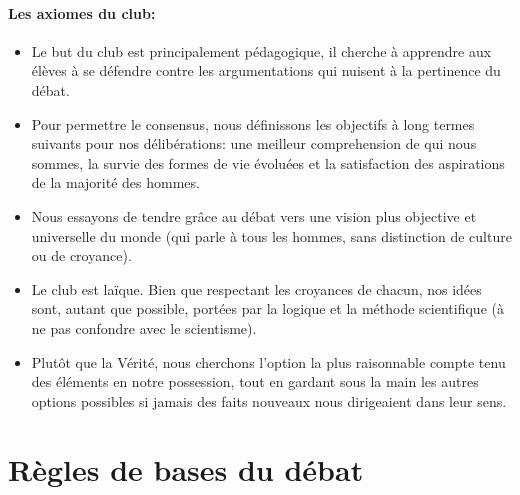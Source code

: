 \documentclass[a4paper,12pt]{article}
\begin{document}
\paragraph{Les axiomes du club:}
\begin{itemize}
 \item  Le but du club est principalement pédagogique, il cherche à apprendre aux élèves à se défendre contre les argumentations qui nuisent à la pertinence du débat.
 \item  Pour permettre le consensus, nous définissons les objectifs à long termes suivants pour nos délibérations: une meilleur comprehension de qui nous sommes, la survie des formes de vie évoluées et la satisfaction des aspirations de la majorité des hommes.
 \item  Nous essayons de tendre grâce au débat vers une vision plus objective et universelle du monde (qui parle à tous les hommes, sans distinction de culture ou de croyance).
 \item  Le club est laïque. Bien que respectant les croyances de chacun, nos idées sont, autant que possible, portées par la logique et la méthode scientifique (à ne pas confondre avec le scientisme).
 \item  Plutôt que la Vérité, nous cherchons l'option la plus raisonnable compte tenu des éléments en notre possession, tout en gardant sous la main les autres options possibles si jamais des faits nouveaux nous dirigeaient dans leur sens.
\end{itemize}

\section{Règles de bases du débat}
\end{document}
